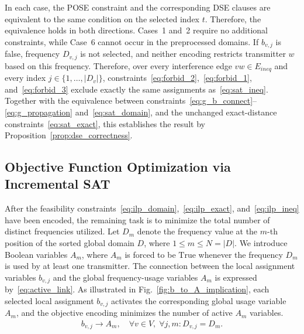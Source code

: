 \documentclass[letterpaper,journal]{IEEEtran}
\begin{document}
\begin{IEEEproof}
In each case, the POSE constraint and the corresponding DSE clauses are equivalent to the same condition on the selected index $t$. Therefore, the equivalence holds in both directions.
Cases~1 and~2 require no additional constraints, while Case~6 cannot occur in the preprocessed domains. If $b_{v,j}$ is false, frequency $D_{v,j}$ is not selected, and neither encoding restricts transmitter $w$ based on this frequency. Therefore, over every interference edge $vw\in E_{ineq}$ and every index $j\in\{1,\ldots,|D_v|\}$, constraints~\eqref{eq:forbid_2},~\eqref{eq:forbid_1}, and~\eqref{eq:forbid_3} exclude exactly the same assignments as~\eqref{eq:sat_ineq}. Together with the equivalence between constraints~\eqref{eq:g_b_connect}--\eqref{eq:g_propagation} and~\eqref{eq:sat_domain}, and the unchanged exact-distance constraints~\eqref{eq:sat_exact}, this establishes the result by Proposition~\ref{prop:dse_correctness}.
\end{IEEEproof}

\subsection{Objective Function Optimization via Incremental SAT}
\label{subsec:incremental_sat}
After the feasibility constraints~\eqref{eq:ilp_domain},~\eqref{eq:ilp_exact}, and~\eqref{eq:ilp_ineq} have been encoded, the remaining task is to minimize the total number of distinct frequencies utilized.
Let $D_m$ denote the frequency value at the $m$-th position of the sorted global domain $D$, where $1 \le m \le N=|D|$.
We introduce Boolean variables $A_m$, where $A_m$ is forced to be $\text{True}$ whenever the frequency $D_m$ is used by at least one transmitter.
The connection between the local assignment variables $b_{v,j}$ and the global frequency-usage variables $A_m$ is expressed by~\eqref{eq:active_link}.
As illustrated in Fig.~\ref{fig:b_to_A_implication}, each selected local assignment $b_{v,j}$ activates the corresponding global usage variable $A_m$, and the objective encoding minimizes the number of active $A_m$ variables.
\begin{align}
    b_{v,j} \rightarrow A_m, \quad \forall v \in V,\; \forall j,m : D_{v,j} = D_m.
    \label{eq:active_link}
\end{align}
\end{document}
